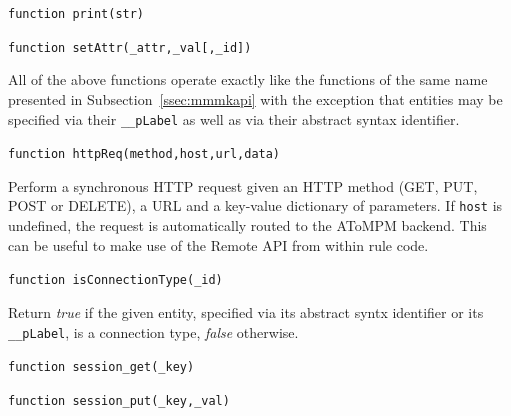 \documentclass{article}
\numberwithin{equation}{section}
\numberwithin{figure}{section}
\begin{document}
\begin{center}	{\large \texttt{function print(str)}} \end{center}


\begin{center}	{\large \texttt{function setAttr(\_attr,\_val[,\_id])}} \end{center}
All of the above functions operate exactly like the functions of the same name presented in Subsection~\ref{ssec:mmmkapi} with the exception that entities may be specified via their \texttt{\_\_pLabel} as well as via their abstract syntax identifier.\\
\vspace*{1em}


\begin{center}	{\large \texttt{function httpReq(method,host,url,data)}} \end{center}
Perform a synchronous HTTP request given an HTTP method (GET, PUT, POST or DELETE), a URL and a key-value dictionary of parameters. If \texttt{host} is undefined, the request is automatically routed to the AToMPM backend. This can be useful to make use of the Remote API from within rule code.\\
\vspace*{1em}


\begin{center}	{\large \texttt{function isConnectionType(\_id)}} \end{center}

Return \textit{true} if the given entity, specified via its abstract syntx identifier or its \texttt{\_\_pLabel}, is a connection type, \textit{false} otherwise.\\
\vspace*{1em}


\begin{center}	{\large \texttt{function session\_get(\_key)}} \end{center}


\begin{center}	{\large \texttt{function session\_put(\_key,\_val)}} \end{center}
\end{document}
